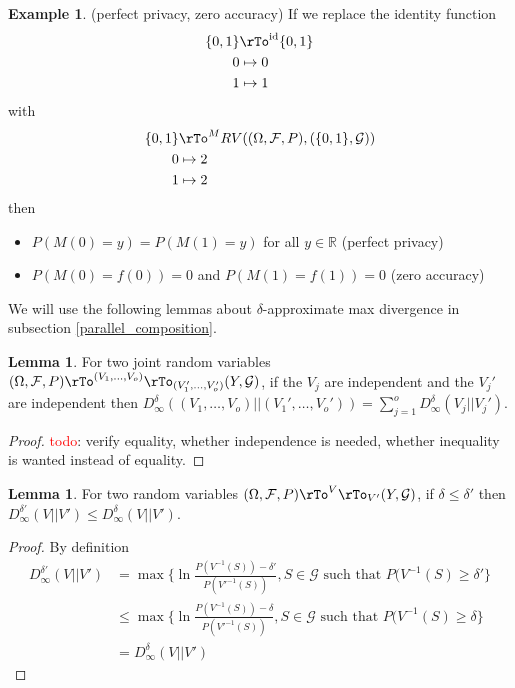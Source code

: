 \documentclass[12pt]{amsart}
\theoremstyle{definition}
\newtheorem{example}[theorem]{Example}
\newtheorem{lemma}[theorem]{Lemma}
\begin{document}
\begin{example} \label{perfect_privacy_zero_accuracy} (perfect privacy, zero accuracy) If we replace the identity function
\begin{align*}
\{0, 1\} & \rTo^{\text{id}} \{0, 1\} \\
0 & \mapsto 0 \\
1 & \mapsto 1 \\
\end{align*}
with
\begin{align*}
\{0, 1\} & \rTo^M RV((\Omega, \mathcal{F}, P), (\{0, 1\}, \mathcal{G})) \\
0 & \mapsto 2 \\
1 & \mapsto 2 \\
\end{align*}
then
\begin{itemize}
\item $P(M(0) = y) = P(M(1) = y)$ for all $y \in \mathbb{R}$ (perfect privacy)
\item $P(M(0) = f(0)) = 0$ and $P(M(1) = f(1)) = 0$ (zero accuracy)
\end{itemize}
\end{example}

We will use the following lemmas about $\delta$-approximate max divergence in subsection \ref{parallel_composition}.

\begin{lemma} \label{delta_max_divergence_joint_random_variables} For two joint random variables $(\Omega, \mathcal{F}, P) \pile{\rTo^{(V_1, \dots , V_o)} \\ \rTo_{(V_1', \dots , V_o')}} (Y, \mathcal{G})$, if the $V_j$ are independent and the $V_j'$ are independent then $D_{\infty}^{\delta} ((V_1, \dots , V_o) || (V_1', \dots , V_o')) = \sum\limits_{j = 1}^o D_{\infty}^{\delta} (V_j || V_j')$.
\end{lemma}
\begin{proof} \textcolor{red}{todo}: verify equality, whether independence is needed, whether inequality is wanted instead of equality.
\end{proof}

\begin{lemma} \label{delta_max_divergence_delta_prime_max_divergence} For two random variables $(\Omega, \mathcal{F}, P) \pile{\rTo^V \\ \rTo_{V'}} (Y, \mathcal{G})$, if $\delta \leq \delta'$ then $D_{\infty}^{\delta'} (V || V') \leq D_{\infty}^{\delta} (V || V')$.
\end{lemma}
\begin{proof} By definition
\begin{align*}
D_{\infty}^{\delta'} (V || V') & = \max \{\ln \frac{P(V^{-1}(S)) - \delta'}{P(V'^{-1}(S))}, S \in \mathcal{G} \text{ such that } P(V^{-1}(S) \geq \delta'\} \\
 & \leq \max \{\ln \frac{P(V^{-1}(S)) - \delta}{P(V'^{-1}(S))}, S \in \mathcal{G} \text{ such that } P(V^{-1}(S) \geq \delta\} \\
 & = D_{\infty}^{\delta} (V || V')
\end{align*}
\end{proof}
\end{document}
